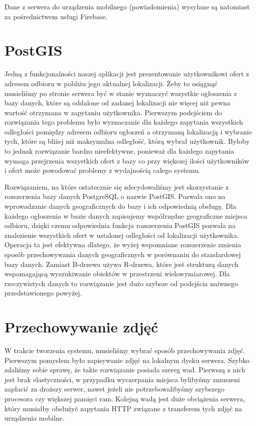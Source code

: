 \documentclass[licencjacka]{pracamgr}
\begin{document}
Dane z serwera do urządzenia mobilnego (powiadomienia) wysyłane są natomiast za pośrednictwem usługi Firebase.

\section{PostGIS}
Jedną z funkcjonalności naszej aplikacji jest prezentowanie użytkownikowi ofert z adresem odbioru w pobliżu jego aktualnej lokalizacji. Żeby to osiągnąć musieliśmy po stronie serwera być w stanie wyznaczyć wszystkie ogłoszenia z bazy danych, które są oddalone od zadanej lokalizacji nie więcej niż pewna wartość otrzymana w zapytaniu użytkownika. Pierwszym podejściem do rozwiązania tego problemu było wyznaczanie dla każdego zapytania wszystkich odległości pomiędzy adresem odbioru ogłoszeń a otrzymaną lokalizacją i wybranie tych, które są bliżej niż maksymalna odległość, którą wybrał użytkownik. Byłoby to jednak rozwiązanie bardzo nieefektywne, ponieważ dla każdego zapytania wymaga przejrzenia wszystkich ofert z bazy co przy większej ilości użytkowników i ofert może powodować problemy z wydajnością całego systemu.

Rozwiązaniem, na które ostatecznie się zdecydowaliśmy jest skorzystanie z rozszerzenia bazy danych PostgreSQL o nazwie PostGIS. Pozwala ono na wprowadzanie danych geograficznych do bazy i ich odpowiednią obsługę. Dla każdego ogłoszenia w bazie danych zapisujemy współrzędne geograficzne miejsca odbioru, dzięki czemu odpowiednia funkcja rozszerzenia PostGIS pozwala na znalezienie wszystkich ofert w ustalonej odległości od lokalizacji użytkownika. Operacja ta jest efektywna dlatego, że wyżej wspomniane rozszerzenie zmienia sposób przechowywania danych geograficznych w porównaniu do standardowej bazy danych. Zamiast B-drzewa używa R-drzewa, które jest strukturą danych wspomagającą wyszukiwanie obiektów w przestrzeni wielowymiarowej. Dla rzeczywistych danych to rozwiązanie jest dużo szybsze od podejścia naiwnego przedstawionego powyżej.

\section{Przechowywanie zdjęć} 

W trakcie tworzenia systemu, musieliśmy wybrać sposób przechowywania zdjęć. Pierwszym pomysłem było zapisywanie zdjęć na lokalnym dysku serwera. Szybko zdaliśmy sobie sprawę, że takie rozwiązanie posiada szereg wad. Pierwszą z nich jest brak elastyczności, w przypadku wyczerpania miejsca bylibyśmy zmuszeni zapłacić za droższy serwer, nawet jeżeli nie potrzebowalibyśmy szybszego procesora czy większej pamięci ram. Kolejną wadą jest duże obciążenia serwera, który musiałby obsłużyć zapytania HTTP związane z transferem tych zdjęć na urządzenia mobilne. 
\end{document}
